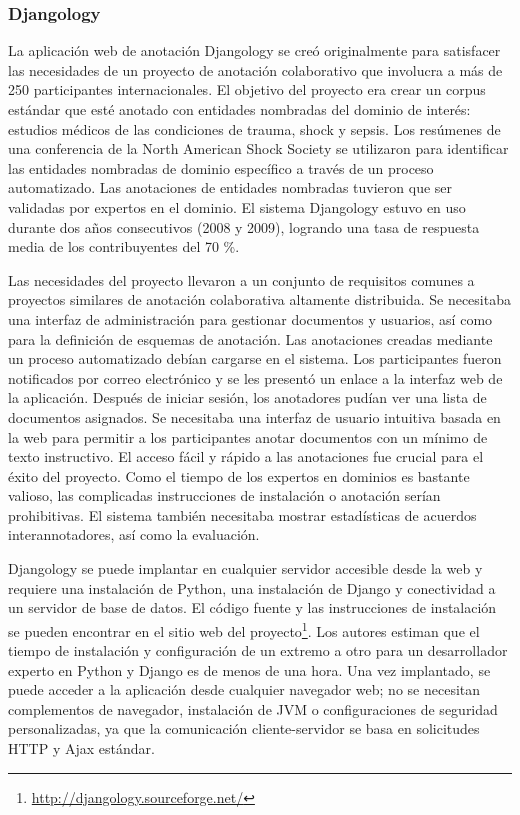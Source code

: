 \subsubsection*{Djangology}

La aplicación web de anotación Djangology se creó originalmente para satisfacer las necesidades de un proyecto de anotación colaborativo que involucra a más de 250 participantes internacionales.
El objetivo del proyecto era crear un corpus estándar que esté anotado con entidades nombradas del dominio de interés: estudios médicos de las condiciones de trauma, shock y sepsis.
Los resúmenes de una conferencia de la North American Shock Society se utilizaron para identificar las entidades nombradas de dominio específico a través de un proceso automatizado.
Las anotaciones de entidades nombradas tuvieron que ser validadas por expertos en el dominio.
El sistema Djangology estuvo en uso durante dos años consecutivos (2008 y 2009), logrando una tasa de respuesta media de los contribuyentes del 70 \%.

Las necesidades del proyecto llevaron a un conjunto de requisitos comunes a proyectos similares de anotación colaborativa altamente distribuida.
Se necesitaba una interfaz de administración para gestionar documentos y usuarios, así como para la definición de esquemas de anotación.
Las anotaciones creadas mediante un proceso automatizado debían cargarse en el sistema.
Los participantes fueron notificados por correo electrónico y se les presentó un enlace a la interfaz web de la aplicación.
Después de iniciar sesión, los anotadores pudían ver una lista de documentos asignados.
Se necesitaba una interfaz de usuario intuitiva basada en la web para permitir a los participantes anotar documentos con un mínimo de texto instructivo.
El acceso fácil y rápido a las anotaciones fue crucial para el éxito del proyecto.
Como el tiempo de los expertos en dominios es bastante valioso, las complicadas instrucciones de instalación o anotación serían prohibitivas.
El sistema también necesitaba mostrar estadísticas de acuerdos interannotadores, así como la evaluación.

Djangology se puede implantar en cualquier servidor accesible desde la web y requiere una instalación de Python, una instalación de Django y conectividad a un servidor de base de datos.
El código fuente y las instrucciones de instalación se pueden encontrar en el sitio web del proyecto\footnote{\url{http://djangology.sourceforge.net/}}.
Los autores estiman que el tiempo de instalación y configuración de un extremo a otro para un desarrollador experto en Python y Django es de menos de una hora.
Una vez implantado, se puede acceder a la aplicación desde cualquier navegador web; no se necesitan complementos de navegador, instalación de JVM o configuraciones de seguridad personalizadas, ya que la comunicación cliente-servidor se basa en solicitudes HTTP y Ajax estándar.

